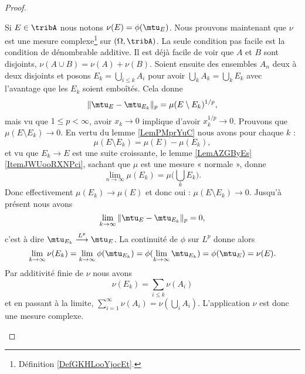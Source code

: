 \begin{proof}
\begin{subproof}
            Si \( E\in\tribA\) nous notons \( \nu(E)=\phi(\mtu_E)\). Nous prouvons maintenant que \( \nu\) est une mesure complexe\footnote{Définition \ref{DefGKHLooYjocEt}.} sur \( (\Omega,\tribA)\). La seule condition pas facile est la condition de dénombrable additive. Il est déjà facile de voir que \( A\) et \( B\) sont disjoints, \( \nu(A\cup B)=\nu(A)+\nu(B)\). Soient ensuite des ensembles \( A_n\) deux à deux disjoints et posons \( E_k=\bigcup_{i\leq k}A_i\) pour avoir \( \bigcup_kA_k=\bigcup_kE_k\) avec l'avantage que les \( E_k\) soient emboîtés. Cela donne
            \begin{equation}
                \| \mtu_E-\mtu_{E_k} \|_p=\mu(E\setminus E_k)^{1/p},
            \end{equation}
            mais vu que \( 1\leq p<\infty\), avoir \( x_k\to 0\) implique d'avoir \( x_k^{1/p}\to 0\). Prouvons que \( \mu(E\setminus E_k)\to 0\). En vertu du lemme \ref{LemPMprYuC} nous avons pour chaque \( k\) :
            \begin{equation}
                \mu(E\setminus E_k)=\mu(E)-\mu(E_k),
            \end{equation}
            et vu que \( E_k\to E\) est une suite croissante, le lemme \ref{LemAZGByEs}\ref{ItemJWUooRXNPci}, sachant que \( \mu\) est une mesure « normale », donne
            \begin{equation}
                \lim_{n\to \infty} \mu(E_k)=\mu\big( \bigcup_kE_k \big).
            \end{equation}
            Donc effectivement \( \mu(E_k)\to \mu(E)\) et donc oui : \( \mu(E\setminus E_k)\to 0\). Jusqu'à présent nous avons
            \begin{equation}
                \lim_{k\to \infty} \| \mtu_E-\mtu_{E_k} \|_p=0,
            \end{equation}
            c'est à dire \( \mtu_{E_k}\stackrel{L^p}{\longrightarrow}\mtu_E\). La continuité de \( \phi\) sur \( L^p\) donne alors
            \begin{equation}
                \lim_{k\to \infty} \nu(E_k)=\lim_{k\to \infty} \phi(\mtu_{E_k})=\phi(\lim_{k\to \infty} \mtu_{E_k})=\phi(\mtu_E)=\nu(E).
            \end{equation}
            Par additivité finie de \( \nu\) nous avons
            \begin{equation}
                \nu(E_k)=\sum_{i\leq k}\nu(A_i)
            \end{equation}
            et en passant à la limite, \( \sum_{i=1}^{\infty}\nu(A_i)=\nu(\bigcup_{i}A_i)\). L'application \( \nu\) est donc une mesure complexe.


\end{subproof}
\end{proof}
